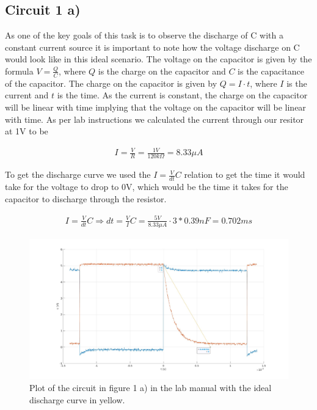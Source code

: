 \documentclass[onecolumn]{article}
\begin{document}
\subsection{Circuit 1 a)}
As one of the key goals of this task is to observe the discharge of C with a constant current source it is important to note how the voltage discharge on C would look like in this ideal scenario. The voltage on the capacitor is given by the formula $V = \frac{Q}{C}$, where $Q$ is the charge on the capacitor and $C$ is the capacitance of the capacitor. The charge on the capacitor is given by $Q = I \cdot t$, where $I$ is the current and $t$ is the time. As the current is constant, the charge on the capacitor will be linear with time implying that the voltage on the capacitor will be linear with time.
As per lab instructions we calculated the current through our resitor at 1V to be 

\begin{align}
    I = \frac{V}{R} = \frac{1V}{120k\Omega} = 8.33\mu A
\end{align}

To get the discharge curve we used the $I = \frac{V}{dt}C$ relation to get the time it would take for the voltage to drop to 0V, which would be the time it takes for the capacitor to discharge through the resistor.

\begin{align}
    I = \frac{V}{dt}C \Rightarrow dt = \frac{V}{I} C = \frac{5V}{8.33\mu A}\cdot 3*0.39nF = 0.702ms
\end{align}

\begin{figure}[h!]
    \centering
    \includegraphics[width=1\textwidth]{1aaa.jpg}
    \caption{Plot of the circuit in figure 1 a) in the lab manual with the ideal discharge curve in yellow.}
    \label{fig:task1a}
\end{figure}
\end{document}
